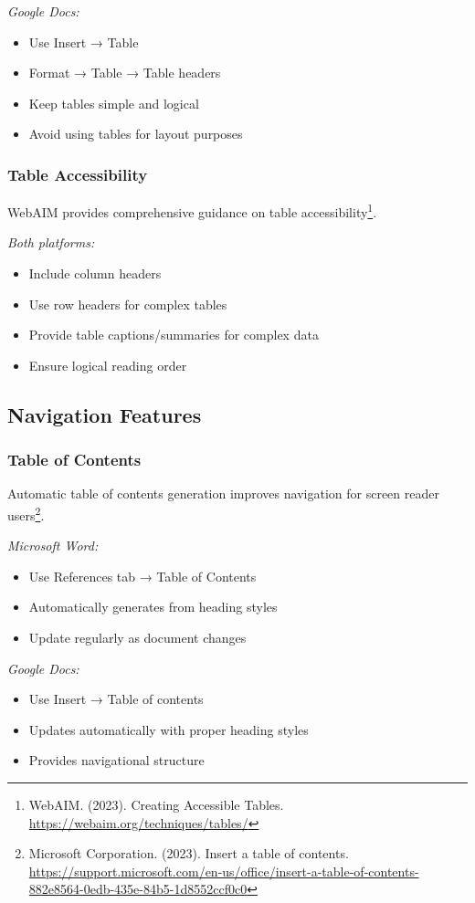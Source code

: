 \emph{Google Docs:}
\begin{itemize}
\item Use Insert → Table
\item Format → Table → Table headers
\item Keep tables simple and logical
\item Avoid using tables for layout purposes
\end{itemize}

\subsubsection{Table Accessibility}
WebAIM provides comprehensive guidance on table accessibility\footnote{WebAIM. (2023). Creating Accessible Tables. \url{https://webaim.org/techniques/tables/}}.

\emph{Both platforms:}
\begin{itemize}
\item Include column headers
\item Use row headers for complex tables
\item Provide table captions/summaries for complex data
\item Ensure logical reading order
\end{itemize}

\subsection{Navigation Features}

\subsubsection{Table of Contents}
Automatic table of contents generation improves navigation for screen reader users\footnote{Microsoft Corporation. (2023). Insert a table of contents. \url{https://support.microsoft.com/en-us/office/insert-a-table-of-contents-882e8564-0edb-435e-84b5-1d8552ccf0c0}}.

\emph{Microsoft Word:}
\begin{itemize}
\item Use References tab → Table of Contents
\item Automatically generates from heading styles
\item Update regularly as document changes
\end{itemize}

\emph{Google Docs:}
\begin{itemize}
\item Use Insert → Table of contents
\item Updates automatically with proper heading styles
\item Provides navigational structure
\end{itemize}

